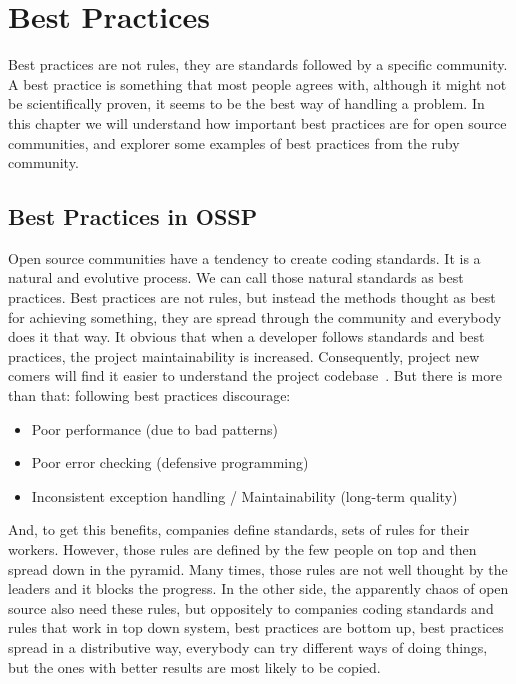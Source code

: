 \thispagestyle{empty}
\chapter{Best Practices}\label{chap:best_practices}

Best practices are not rules, they are standards followed by a specific community. 
A best practice is something that most people agrees with, 
although it might not be scientifically proven,
it seems to be the best way of handling a problem.
In this chapter we will understand how important best practices are for open source communities, 
and explorer some examples of best practices from the ruby community.



\section{Best Practices in OSSP} \label{sec:best_practices_ossp}
Open source communities have a tendency to create coding standards. It is a natural and evolutive process.
We can call those natural standards as best practices. 
Best practices are not rules, but instead the methods thought as best for achieving something, 
they are spread through the community and everybody does it that way.
It obvious that when a developer follows standards and best practices, the project maintainability is increased.
Consequently, project new comers will find it easier to understand the project codebase~\cite{dromey2002model}.
But there is more than that: following best practices discourage:
\begin{itemize}
\item Poor performance (due to bad patterns)
\item Poor error checking (defensive programming)
\item Inconsistent exception handling / Maintainability (long-term quality)
\end{itemize}

And, to get this benefits, companies define standards, sets of rules for their workers.
However, those rules are defined by the few people on top and then spread down in the pyramid.
Many times, those rules are not well thought by the leaders and it blocks the progress.
In the other side, the apparently chaos of open source also need these rules, 
but oppositely to companies coding standards and rules that work in top down system, 
best practices are bottom up, best practices spread in a distributive way,
everybody can try different ways of doing things, but the ones with better results are most likely to be copied.

